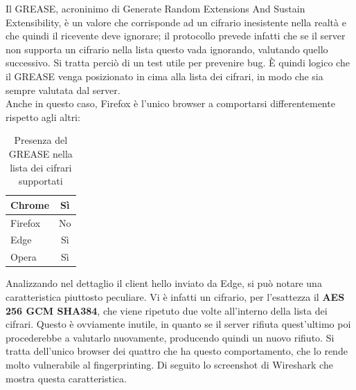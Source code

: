 Il GREASE,  acroninimo di Generate Random Extensions And Sustain Extensibility, è un valore che corrisponde ad un cifrario inesistente nella realtà e che quindi il ricevente deve ignorare; il protocollo prevede infatti che se il server non supporta un cifrario nella lista questo vada ignorando, valutando quello successivo. Si tratta perciò di un test utile per prevenire bug.
È quindi logico che il GREASE venga posizionato in cima alla lista dei cifrari, in modo che sia sempre valutata dal server.
\\
Anche in questo caso, Firefox è l'unico browser a comportarsi differentemente rispetto agli altri:
\\
\begin{table}[h]
	\centering
	\begin{tabular}{| l | c |}
		\hline
		\rowcolor{yellow!10}Chrome & Sì
		\\
		\hline
		\rowcolor{orange!10}Firefox & No
		\\
		\hline
		\rowcolor{blue!10}Edge &Sì
		\\
		\hline
		\rowcolor{red!10}Opera & Sì
		\\
		\hline
		
	\end{tabular}
	\caption{Presenza del GREASE nella lista dei cifrari supportati}
	\label{tab:grease}
\end{table}

Analizzando nel dettaglio il client hello inviato da Edge, si può notare una caratteristica piuttosto peculiare. Vi è infatti un cifrario, per l'esattezza il \textbf{AES 256 GCM SHA384}, che viene ripetuto due volte all'interno della lista dei cifrari. Questo è ovviamente inutile, in quanto se il server rifiuta quest'ultimo poi procederebbe a valutarlo nuovamente, producendo quindi un nuovo rifiuto. Si tratta dell'unico browser dei quattro che ha questo comportamento, che lo rende molto vulnerabile al fingerprinting.
Di seguito lo screenshot di Wireshark che mostra questa caratteristica.

